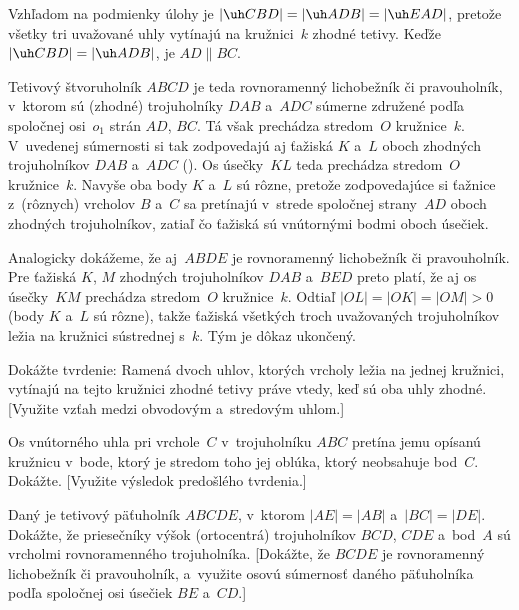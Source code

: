 {%
Vzhľadom na podmienky úlohy je $|\uh CBD|=|\uh ADB|=|\uh EAD|$, pretože
všetky tri uvažované uhly vytínajú na kružnici~$k$ zhodné tetivy.
Keďže $|\uh CBD|=|\uh ADB|$, je $AD\parallel BC$.

Tetivový štvoruholník ${ABCD}$ je teda rovnoramenný lichobežník
či pravouholník, v~ktorom sú (zhodné)
trojuholníky $DAB$ a~$ADC$ súmerne združené podľa spoločnej osi~$o_1$
strán $AD$, $BC$. Tá však prechádza stredom~$O$ kružnice~$k$.
V~uvedenej súmernosti si tak zodpovedajú aj ťažiská $K$ a~$L$ oboch zhodných
trojuholníkov $DAB$ a~$ADC$ (\obr). Os úsečky~$KL$ teda prechádza
stredom~$O$ kružnice~$k$.
Navyše oba body $K$ a~$L$ sú rôzne, pretože zodpovedajúce si ťažnice
z~(rôznych) vrcholov $B$ a~$C$ sa pretínajú v~strede spoločnej strany~$AD$
oboch zhodných trojuholníkov, zatiaľ čo ťažiská sú vnútornými bodmi oboch úsečiek.
%

Analogicky dokážeme, že aj~${ABDE}$ je rovnoramenný lichobežník
či pravouholník. Pre ťažiská $K$, $M$ zhodných trojuholníkov $DAB$
a~$BED$ preto platí, že aj os úsečky~$KM$ prechádza stredom~$O$ kružnice~$k$. Odtiaľ
$|OL|=|OK|=|OM|>0$ (body $K$ a~$L$ sú rôzne), takže ťažiská všetkých troch uvažovaných trojuholníkov
ležia na kružnici sústrednej s~$k$.
Tým je dôkaz ukončený.


Dokážte tvrdenie: Ramená dvoch uhlov, ktorých vrcholy ležia na
jednej kružnici, vytínajú na tejto kružnici zhodné tetivy
práve vtedy, keď sú oba uhly zhodné.
[Využite vzťah medzi obvodovým a~stredovým uhlom.]

Os vnútorného uhla pri vrchole~$C$ v~trojuholníku $ABC$
pretína jemu opísanú kružnicu v~bode, ktorý
je stredom toho jej oblúka, ktorý neobsahuje bod~$C$. Dokážte.
[Využite výsledok predošlého tvrdenia.]

Daný je tetivový päťuholník ${ABCDE}$, v~ktorom
$|AE|=|AB|$ a~$|BC|=|DE|$. Dokážte, že priesečníky výšok (ortocentrá)
trojuholníkov $BCD$, $CDE$ a~bod~$A$ sú vrcholmi rovnoramenného trojuholníka.
[Dokážte, že ${BCDE}$ je rovnoramenný lichobežník či pravouholník, a~využite
osovú súmernosť daného päťuholníka podľa spoločnej osi úsečiek $BE$ a~$CD$.]
}

